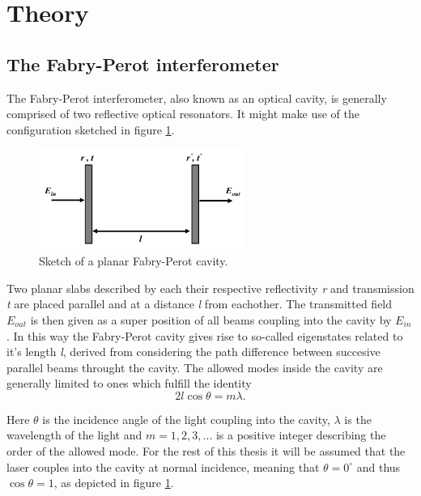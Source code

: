 \section{Theory}
\subsection{The Fabry-Perot interferometer}

The Fabry-Perot interferometer, also known as an optical cavity, is generally comprised of two reflective optical resonators. It might make use of the configuration sketched in figure \ref{fig:planar_fabry-perot}. 


\begin{figure}[h!]
    \centering
    \includegraphics[width=0.6\textwidth]{figures/planar_fabry_perot.pdf}
    \caption{Sketch of a planar Fabry-Perot cavity.}
    \label{fig:planar_fabry-perot}
\end{figure}

Two planar slabs described by each their respective reflectivity \emph{r} and transmission \emph{t} are placed parallel and at a distance \emph{l} from eachother. The transmitted field $E_{out}$ is then given as a super position of all beams coupling into the cavity by $E_{in}$. In this way the Fabry-Perot cavity gives rise to so-called eigenstates\cite{Eichhorn} related to it's length \emph{l}, derived from considering the path difference between succesive parallel beams throught the cavity. The allowed modes inside the cavity are generally limited to ones which fulfill the identity\cite{Pedrotti}
\begin{equation}
    2 l \cos \theta = m \lambda.
    \label{eq:general_cavity_condition}
\end{equation}

Here $\theta$ is the incidence angle of the light coupling into the cavity, $\lambda$ is the wavelength of the light and $m = 1,2,3,...$ is a positive integer describing the order of the allowed mode. For the rest of this thesis it will be assumed that the laser couples into the cavity at normal incidence, meaning that $\theta = 0^{\circ}$ and thus $\cos \theta = 1$, as depicted in figure \ref{fig:planar_fabry-perot}.


